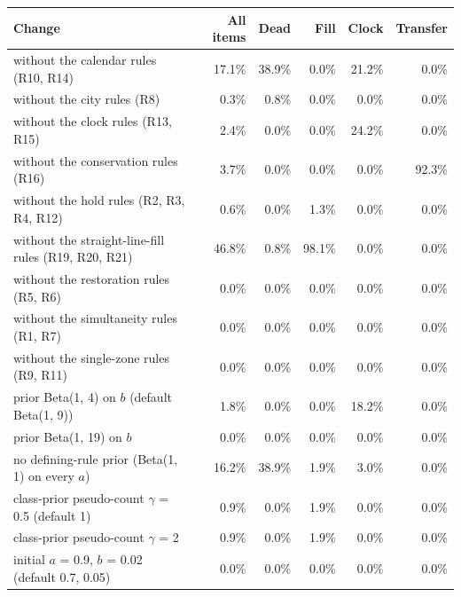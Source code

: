 \documentclass[11pt,a4paper]{article}
\makeatletter
\newenvironment{stable}{\par\addvspace{8pt}\noindent\begin{minipage}{\textwidth}\def\@captype{table}\centering}{\end{minipage}\par\addvspace{8pt}}
\makeatother
\begin{document}
\begin{stable}
\caption{Sensitivity of the real-data labels to every rule family and prior: the share of items whose label changes when one rule family is removed or one prior or initial value is changed, over all 327 items and per item kind (126 dead, 155 fill, 33 clock, 13 transfer). The simultaneity family includes R7, which never fires.}\label{tab:s-robustness}
\footnotesize\setlength{\tabcolsep}{4pt}
\begin{tabular}{@{}l r r r r r@{}}
\toprule
Change & All items & Dead & Fill & Clock & Transfer \\
\midrule
without the calendar rules (R10, R14) & 17.1\% & 38.9\% & 0.0\% & 21.2\% & 0.0\% \\
without the city rules (R8) & 0.3\% & 0.8\% & 0.0\% & 0.0\% & 0.0\% \\
without the clock rules (R13, R15) & 2.4\% & 0.0\% & 0.0\% & 24.2\% & 0.0\% \\
without the conservation rules (R16) & 3.7\% & 0.0\% & 0.0\% & 0.0\% & 92.3\% \\
without the hold rules (R2, R3, R4, R12) & 0.6\% & 0.0\% & 1.3\% & 0.0\% & 0.0\% \\
without the straight-line-fill rules (R19, R20, R21) & 46.8\% & 0.8\% & 98.1\% & 0.0\% & 0.0\% \\
without the restoration rules (R5, R6) & 0.0\% & 0.0\% & 0.0\% & 0.0\% & 0.0\% \\
without the simultaneity rules (R1, R7) & 0.0\% & 0.0\% & 0.0\% & 0.0\% & 0.0\% \\
without the single-zone rules (R9, R11) & 0.0\% & 0.0\% & 0.0\% & 0.0\% & 0.0\% \\
\midrule
prior Beta(1, 4) on $b$ (default Beta(1, 9)) & 1.8\% & 0.0\% & 0.0\% & 18.2\% & 0.0\% \\
prior Beta(1, 19) on $b$ & 0.0\% & 0.0\% & 0.0\% & 0.0\% & 0.0\% \\
no defining-rule prior (Beta(1, 1) on every $a$) & 16.2\% & 38.9\% & 1.9\% & 3.0\% & 0.0\% \\
class-prior pseudo-count $\gamma$ = 0.5 (default 1) & 0.9\% & 0.0\% & 1.9\% & 0.0\% & 0.0\% \\
class-prior pseudo-count $\gamma$ = 2 & 0.9\% & 0.0\% & 1.9\% & 0.0\% & 0.0\% \\
initial $a$ = 0.9, $b$ = 0.02 (default 0.7, 0.05) & 0.0\% & 0.0\% & 0.0\% & 0.0\% & 0.0\% \\
\bottomrule
\end{tabular}
\end{stable}
\end{document}
